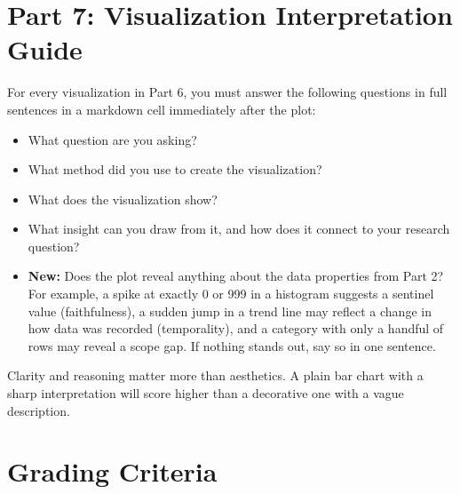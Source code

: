 \documentclass[11pt,letterpaper]{article}
\begin{document}
\section{Part 7: Visualization Interpretation Guide}

For every visualization in Part 6, you must answer the following questions in full sentences in a markdown cell immediately after the plot:
\begin{itemize}
  \item What question are you asking?
  \item What method did you use to create the visualization?
  \item What does the visualization show?
  \item What insight can you draw from it, and how does it connect to your research question?
  \item \textbf{New:} Does the plot reveal anything about the data properties from Part 2? For example, a spike at exactly 0 or 999 in a histogram suggests a sentinel value (faithfulness), a sudden jump in a trend line may reflect a change in how data was recorded (temporality), and a category with only a handful of rows may reveal a scope gap. If nothing stands out, say so in one sentence.
\end{itemize}

Clarity and reasoning matter more than aesthetics. A plain bar chart with a sharp interpretation will score higher than a decorative one with a vague description.

\section{Grading Criteria}
\end{document}

